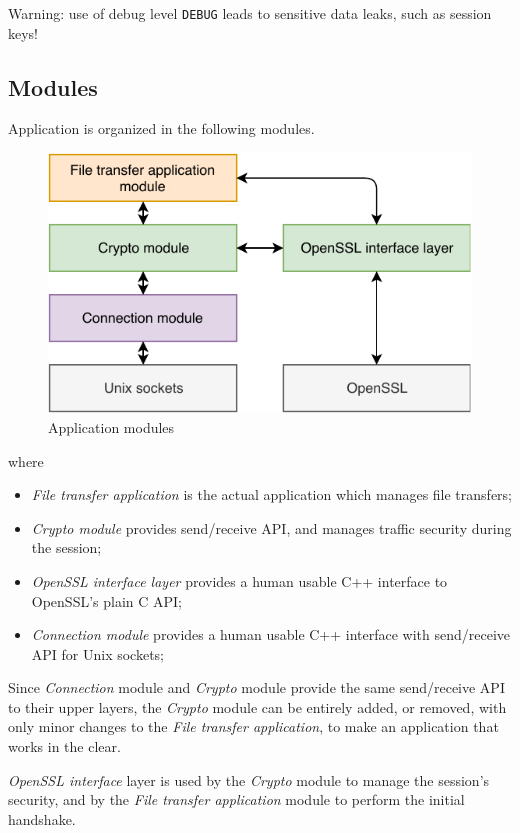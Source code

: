 \documentclass[a4paper,12pt]{article}
\begin{document}
Warning: use of debug level \texttt{DEBUG} leads to sensitive data leaks, such as session keys!

\subsection{Modules}
Application is organized in the following modules.

\begin{figure}[H]
  \centering
  \includegraphics{img/modules.pdf}
  \caption{Application modules}
  \label{img:modules}
\end{figure}

where
\begin{itemize}
  \item \emph{File transfer application} is the actual application which manages file transfers;
  \item \emph{Crypto module} provides send/receive API, and manages traffic security during the session;
  \item \emph{OpenSSL interface layer} provides a human usable C++ interface to OpenSSL's plain C API;
  \item \emph{Connection module} provides a human usable C++ interface with send/receive API for Unix sockets;
\end{itemize}

Since \emph{Connection} module and \emph{Crypto} module provide the same send/receive API to their upper layers, the \emph{Crypto} module can be entirely added, or removed, with only minor changes to the \emph{File transfer application}, to make an application that works in the clear.

\emph{OpenSSL interface} layer is used by the \emph{Crypto} module to manage the session's security, and by the \emph{File transfer application} module to perform the initial handshake.
\end{document}

